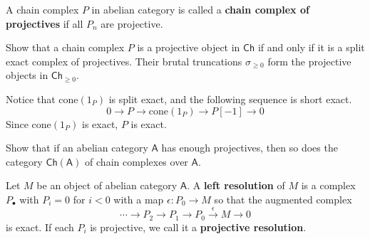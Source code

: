 \begin{defn} A chain complex $P$ in abelian category is called a \textbf{chain complex of projectives} if all $P_n$ are projective.
\end{defn}

\begin{exer} Show that a chain complex $P$ is a projective object in $\mathsf{Ch}$ if and only if it is a split exact complex of projectives. Their brutal truncations $\sigma_{\geq 0}$ form the projective objects in $\mathsf{Ch}_{\geq 0}$.
\end{exer}
\begin{solution} Notice that $\textrm{cone}(1_P)$ is split exact, and the following sequence is short exact.
\begin{equation}
0\rightarrow P\rightarrow \textrm{cone}(1_P)\rightarrow P[-1]\rightarrow 0
\end{equation}
Since $\textrm{cone}(1_P)$ is exact, $P$ is exact. 
\end{solution}

\begin{exer} Show that if an abelian category $\mathsf{A}$ has enough projectives, then so does the category $\mathsf{Ch}(\mathsf{A})$ of chain complexes over $\mathsf{A}$.
\end{exer}
\begin{solution} 
\end{solution}

\begin{defn} Let $M$ be an object of abelian category $\mathsf{A}$. A \textbf{left resolution} of $M$ is a complex $P_\bullet$ with $P_i=0$ for $i<0$ with a map $\epsilon:P_0\rightarrow M$ so that the augmented complex
\begin{equation}
\cdots\rightarrow P_2\rightarrow P_1\rightarrow P_0\xrightarrow{\epsilon} M\rightarrow 0
\end{equation}
is exact. If each $P_i$ is projective, we call it a \textbf{projective resolution}.
\end{defn}

